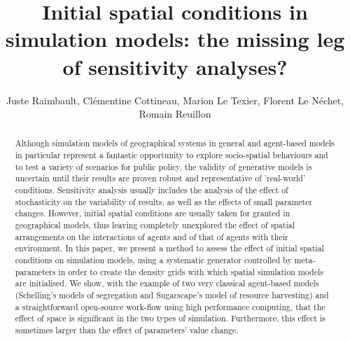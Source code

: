 \documentclass[Afour,sageh,times]{sagej}
\begin{document}




\title{Initial spatial conditions in simulation models: the missing leg of sensitivity analyses?}

\author{Juste Raimbault, 
Cl{\' e}mentine Cottineau,
Marion Le Texier, 
Florent Le N{\' e}chet, 
Romain Reuillon
}








\begin{abstract}
Although simulation models of geographical systems in general and agent-based models in particular represent a fantastic opportunity to explore socio-spatial behaviours and to test a variety of scenarios for public policy, the validity of generative models is uncertain until their results are proven robust and representative of 'real-world' conditions. Sensitivity analysis usually includes the analysis of the effect of stochasticity on the variability of results, as well as the effects of small parameter changes. However, initial spatial conditions are usually taken for granted in geographical models, thus leaving completely unexplored the effect of spatial arrangements on the interactions of agents and of that of agents with their environment. In this paper, we present a method to assess the effect of initial spatial conditions on simulation models, using a systematic generator controlled by meta-parameters in order to create the density grids with which spatial simulation models are initialised. We show, with the example of two very classical agent-based models (Schelling's models of segregation and Sugarscape's model of resource harvesting) and a straightforward open-source work-flow using high performance computing, that the effect of space is significant in the two types of simulation. Furthermore, this effect is sometimes larger than the effect of parameters' value change. 
\end{abstract}
\end{document}
